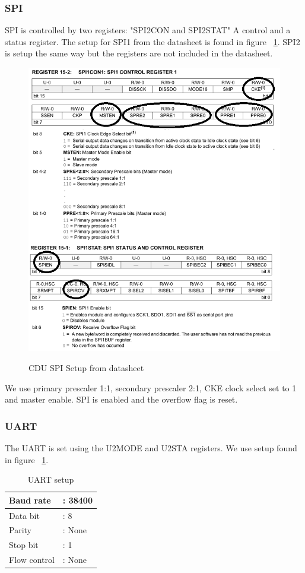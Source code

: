 \subsubsection{SPI}
SPI is controlled by two registers: "SPI2CON and SPI2STAT" A control and a status register. The setup for SPI1 from the datasheet is found in figure ~\ref{fig:spisetup}. SPI2 is setup the same way but the registers are not included in the datasheet.\\
\begin{figure}[H]
\centering
\includegraphics[width=1\textwidth]{billeder/spisetup}
\label{fig:spisetup}
\caption{CDU SPI Setup from datasheet}
\end{figure}
We use primary prescaler 1:1, secondary prescaler 2:1, CKE clock select set to 1 and master enable. SPI is enabled and the overflow flag is reset.
\subsubsection{UART}
The UART is set using the U2MODE and U2STA registers. We use setup found in figure ~\ref{fig:uartsetp}.\\
\begin{table}[H]
    \begin{tabular}{|l l|}
    \hline
    Baud rate    & : 38400 \\ \hline
    Data bit     & : 8    \\ \hline
    Parity       & : None \\ \hline
    Stop bit     & : 1    \\ \hline
    Flow control & : None \\ \hline
    \end{tabular}
    \label{fig:uartsetp}
    \caption{UART setup}
\end{table}

